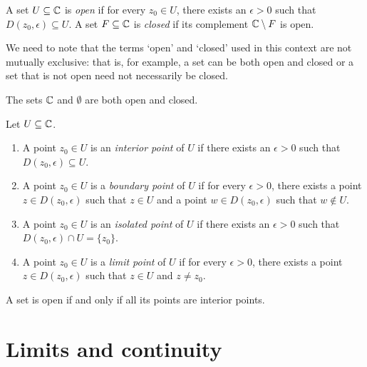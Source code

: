 \begin{definition}
    A set \(U \subseteq \mathbb{C}\) is \emph{open} if for every \(z_0 \in U\), there exists an \(\epsilon > 0\) such that \(D(z_0, \epsilon) \subseteq U\). A set \(F \subseteq \mathbb{C}\) is \emph{closed} if its complement \(\mathbb{C} \setminus F\) is open.
    \label{def:open-closed-sets}
\end{definition}

We need to note that the terms `open' and `closed' used in this context are not mutually exclusive: that is, for example, a set can be both open and closed or a set that is not open need not necessarily be closed.

\begin{example}
    The sets \(\mathbb{C}\) and \(\emptyset\) are both open and closed.
\end{example}


\begin{definition}%
    Let \(U \subseteq \mathbb{C}\).
    \begin{enumerate}[label=(\alph*)]
        \item A point \(z_0 \in U\) is an \emph{interior point} of \(U\) if there exists an \(\epsilon > 0\) such that \(D(z_0, \epsilon) \subseteq U\).
        \item A point \(z_0 \in U\) is a \emph{boundary point} of \(U\) if for every \(\epsilon > 0\), there exists a point \(z \in D(z_0, \epsilon)\) such that \(z \in U\) and a point \(w \in D(z_0, \epsilon)\) such that \(w \notin U\).
        \item A point \(z_0 \in U\) is an \emph{isolated point} of \(U\) if there exists an \(\epsilon > 0\) such that \(D(z_0, \epsilon) \cap U = \{z_0\}\).
        \item A point \(z_0 \in U\) is a \emph{limit point} of \(U\) if for every \(\epsilon > 0\), there exists a point \(z \in D(z_0, \epsilon)\) such that \(z \in U\) and \(z \neq z_0\).
    \end{enumerate}
    \label{def:taxonomy-points}
\end{definition}

\begin{theorem}
    A set is open if and only if all its points are interior points.
    \label{thm:open-interior}
\end{theorem}

\section{Limits and continuity}

